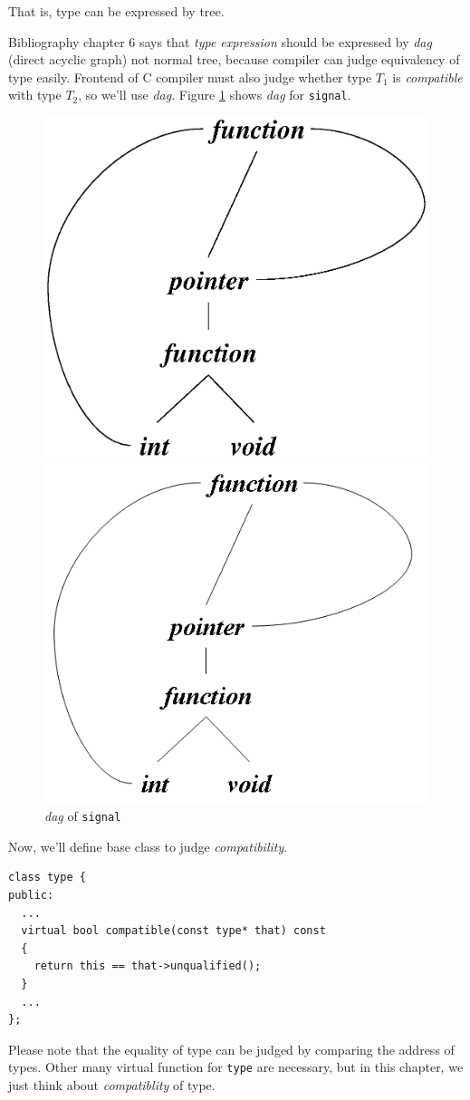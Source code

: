 That is, type can be expressed by tree.

Bibliography \cite{doragon} chapter 6 says that
{\em type expression} should be expressed by {\em dag}
(direct acyclic graph) not normal tree, because
compiler can judge equivalency of type easily. Frontend of C compiler
must also judge whether type $T_1$ is {\it compatible} with
type $T_2$, so we'll use {\em dag}. Figure \ref{type_e000}
shows {\em dag} for {\tt{signal}}.

\hspace{0.5cm}
\begin{figure}[htbp]
\begin{center}
\begin{latexonly}
\includegraphics[width=0.5\linewidth,height=0.5\linewidth]{dag.eps}
\end{latexonly}
\begin{htmlonly}
\includegraphics[width=0.3\linewidth,height=0.3\linewidth]{dag.png}
\end{htmlonly} 
\caption{{\em dag} of {\tt{signal}}}
\label{type_e000}
\end{center}
\end{figure}

Now, we'll define base class to judge {\it compatibility}.
\begin{verbatim}
class type {
public:
  ...
  virtual bool compatible(const type* that) const
  {
    return this == that->unqualified();
  }
  ...
};
\end{verbatim}
Please note that the equality of type can be judged by
comparing the address of types.
Other many virtual function for {\tt{type}} are necessary,
but in this chapter, we just think about {\it compatiblity} of type.

